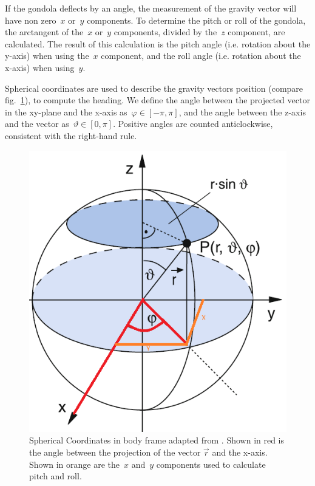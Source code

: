 If the gondola deflects by an angle, the measurement of the gravity vector will have non zero~$x$ or~$y$ components. To determine the pitch or roll of the gondola, the arctangent of the~$x$ or~$y$ components, divided by the~$z$ component, are calculated. The result of this calculation is the pitch angle (i.e. rotation about the y-axis) when using the~$x$ component, and the roll angle (i.e. rotation about the x-axis) when using~$y$.

Spherical coordinates are used to describe the gravity vectors position (compare fig.~\ref{fig:meth:spherical_coordinates}), to compute the heading. We define the angle between the projected vector in the xy-plane and the x-axis as~$\varphi\in[-\pi,\pi]$, and the angle between the z-axis and the vector as~$\vartheta\in[0,\pi]$. Positive angles are counted anticlockwise, consistent with the right-hand rule.

\begin{figure}[H]
    \centering
    \includegraphics[width=0.5\linewidth]{images/02_methodology/spherical_coords.png}
    \caption[Spherical Coordinates adapted from \parencite{Demtröder2020-mw}.]{Spherical Coordinates in body frame adapted from \parencite{Demtröder2020-mw}. Shown in red is the angle between the projection of the vector $\vec{r}$ and the x-axis. Shown in orange are the~$x$ and~$y$ components used to calculate pitch and roll.}
    \label{fig:meth:spherical_coordinates}
\end{figure}

